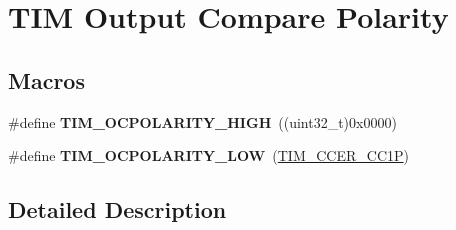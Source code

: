 \hypertarget{group___t_i_m___output___compare___polarity}{}\section{T\+IM Output Compare Polarity}
\label{group___t_i_m___output___compare___polarity}
\subsection*{Macros}
\begin{DoxyCompactItemize}
\item 
\#define {\bfseries T\+I\+M\+\_\+\+O\+C\+P\+O\+L\+A\+R\+I\+T\+Y\+\_\+\+H\+I\+GH}~((uint32\+\_\+t)0x0000)\hypertarget{group___t_i_m___output___compare___polarity_ga5887380660b742f0045e9695914231b8}{}\label{group___t_i_m___output___compare___polarity_ga5887380660b742f0045e9695914231b8}

\item 
\#define {\bfseries T\+I\+M\+\_\+\+O\+C\+P\+O\+L\+A\+R\+I\+T\+Y\+\_\+\+L\+OW}~(\hyperlink{group___peripheral___registers___bits___definition_ga0ca0aedba14241caff739afb3c3ee291}{T\+I\+M\+\_\+\+C\+C\+E\+R\+\_\+\+C\+C1P})\hypertarget{group___t_i_m___output___compare___polarity_ga1daff1574b0a2d17ccc9ae40a649ac37}{}\label{group___t_i_m___output___compare___polarity_ga1daff1574b0a2d17ccc9ae40a649ac37}

\end{DoxyCompactItemize}


\subsection{Detailed Description}
